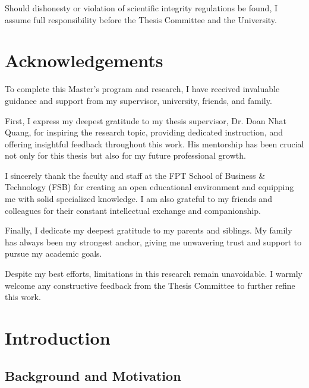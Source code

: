 \documentclass[12pt,a4paper]{report}
\begin{document}
Should dishonesty or violation of scientific integrity regulations be found, I assume full responsibility before the Thesis Committee and the University.
\chapter*{Acknowledgements}
To complete this Master's program and research, I have received invaluable guidance and support from my supervisor, university, friends, and family.

First, I express my deepest gratitude to my thesis supervisor, Dr. Doan Nhat Quang, for inspiring the research topic, providing dedicated instruction, and offering insightful feedback throughout this work. His mentorship has been crucial not only for this thesis but also for my future professional growth.

I sincerely thank the faculty and staff at the FPT School of Business \& Technology (FSB) for creating an open educational environment and equipping me with solid specialized knowledge. I am also grateful to my friends and colleagues for their constant intellectual exchange and companionship.

Finally, I dedicate my deepest gratitude to my parents and siblings. My family has always been my strongest anchor, giving me unwavering trust and support to pursue my academic goals.

Despite my best efforts, limitations in this research remain unavoidable. I warmly welcome any constructive feedback from the Thesis Committee to further refine this work.
\clearpage
\tableofcontents

\clearpage

\listoftables
{}

\clearpage

\listoffigures
{}

\clearpage

\setcounter{page}{1}

\chapter{Introduction}

\section{Background and Motivation}
\end{document}
